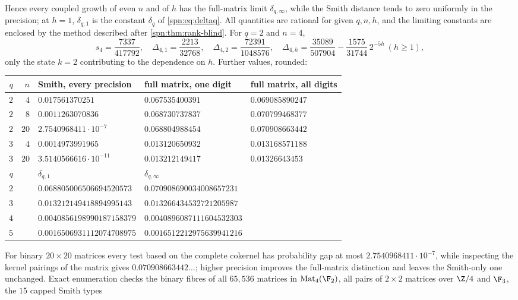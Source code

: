 Hence every coupled growth of even $n$ and of $h$ has the full-matrix limit $\delta_{q,\infty}$, while
the Smith distance tends to zero uniformly in the precision; at $h=1$, $\delta_{q,1}$ is the constant
$\delta_q$ of \eqref{spn:eq:deltaq}. All quantities are rational for given $q,n,h$, and the limiting
constants are enclosed by the method described after \cref{spn:thm:rank-blind}. For $q=2$ and $n=4$,
\[
 s_4=\frac{7337}{417792},\quad \Delta_{4,1}=\frac{2213}{32768},\quad\Delta_{4,2}=\frac{72391}{1048576},\quad
 \Delta_{4,h}=\frac{35089}{507904}-\frac{1575}{31744}\,2^{-5h}\ (h\ge1),
\]
only the state $k=2$ contributing to the dependence on $h$. Further values, rounded:
\begin{center}\small
\begin{tabular}{rrlll}
\toprule
$q$ & $n$ & Smith, every precision & full matrix, one digit & full matrix, all digits\\
\midrule
$2$ & $4$ & $0.017561370251$ & $0.067535400391$ & $0.069085890247$\\
$2$ & $8$ & $0.0011263070836$ & $0.068730737837$ & $0.070799468377$\\
$2$ & $20$ & $2.7540968411\cdot10^{-7}$ & $0.068804988454$ & $0.070908663442$\\
$3$ & $4$ & $0.0014973991965$ & $0.013120650932$ & $0.013168571188$\\
$3$ & $20$ & $3.5140566616\cdot10^{-11}$ & $0.013212149417$ & $0.01326643453$\\
\midrule
$q$ & & $\delta_{q,1}$ & $\delta_{q,\infty}$ &\\
\midrule
$2$ & & $0.068805006506694520573$ & $0.070908690034008657231$ &\\
$3$ & & $0.013212149418894995143$ & $0.013266434532721205987$ &\\
$4$ & & $0.0040856198990187158379$ & $0.0040896087111604532303$ &\\
$5$ & & $0.0016506931112074708975$ & $0.0016512212975639941216$ &\\
\bottomrule
\end{tabular}
\end{center}
For binary $20\times20$ matrices every test based on the complete cokernel has probability gap at most
$2.7540968411\cdot10^{-7}$, while inspecting the kernel pairings of the matrix gives
$0.070908663442\ldots$; higher precision improves the full-matrix distinction and leaves the
Smith-only one unchanged. Exact enumeration checks the binary fibres of all $65{,}536$ matrices in
$\spnMat_4(\F_2)$, all pairs of $2\times2$ matrices over $\Z/4$ and $\F_3$, the $15$ capped Smith types
